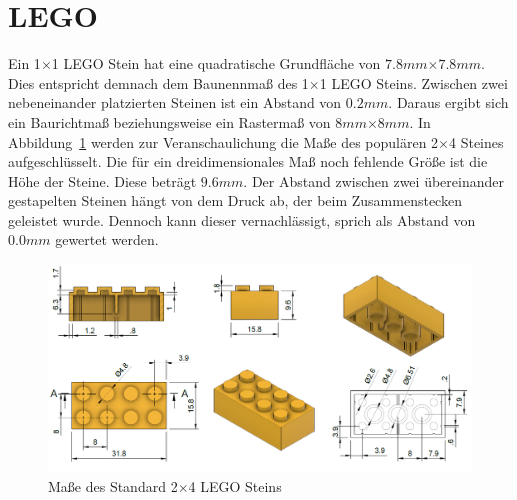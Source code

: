
\section{LEGO}
\label{basics:lego}
Ein 1$\times$1 LEGO Stein hat eine quadratische Grundfläche von \(7.8mm\)$\times$\(7.8mm\).
Dies entspricht demnach dem Baunennmaß des 1$\times$1 LEGO Steins.
Zwischen zwei nebeneinander platzierten Steinen ist ein Abstand von  \(0.2mm\).
Daraus ergibt sich ein Baurichtmaß beziehungsweise ein Rastermaß von \(8mm\)$\times$\(8mm\).
In Abbildung~\ref{fig:basics:Lego 2x4 Brick} werden zur Veranschaulichung die Maße des populären 2$\times$4 Steines aufgeschlüsselt.
Die für ein dreidimensionales Maß noch fehlende Größe ist die Höhe der Steine.
Diese beträgt \(9.6mm\).
Der Abstand zwischen zwei übereinander gestapelten Steinen hängt von dem Druck ab, der beim Zusammenstecken geleistet wurde.
Dennoch kann dieser vernachlässigt, sprich als Abstand von \(0.0mm\) gewertet werden.

\begin{figure}[ht]
    \centering
    \includegraphics[width=0.8\columnwidth]{fig/LEGO 2x4 Brick horizontal.png}
    \caption{Maße des Standard 2$\times$4 LEGO Steins~\cite{LEGOBric2:online}}
    \label{fig:basics:Lego 2x4 Brick}
\end{figure}

